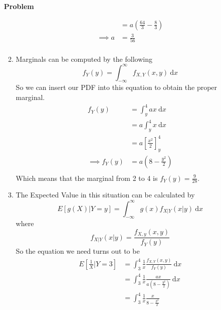 \documentclass[12pt]{article}
\newenvironment{Ex}{\textbf{Problem}\vspace{.75em}\\}{}
\newcommand{\dd}[1]{\:\mathrm{d}{#1}}
\begin{document}
\begin{enumerate}
\begin{Ex}
\begin{solution}
\begin{enumerate}
\begin{equation}
\begin{aligned}
            &= a \left(\frac{64}{3} - \frac{8}{3}\right) \\
            \implies a&=\frac{3}{56} \\
          \end{aligned}
        \end{equation}
      \item Marginals can be computed by the following
        \begin{equation}
          \label{eq:1b-marginal-def}
          f_Y(y) = \int_{-\infty}^{\infty} f_{X,Y}(x,y) \dd{x}
        \end{equation}
        So we can insert our PDF into this equation to obtain the
        proper marginal.
        \begin{equation}
          \label{eq:1b-sol}
          \begin{aligned}
            f_Y(y) &= \int_{y}^{4} ax \dd{x} \\
            &= a \int_{y}^{4} x \dd{x} \\
            &= a \left[\frac{x^2}{2}\right]_y^4 \\
            \implies f_Y(y) &= a \left(8 - \frac{y^2}{2}\right) \\
          \end{aligned}
        \end{equation}
        Which means that the marginal from 2 to 4 is $f_Y(y) =
        \frac{9}{28}$.
      \item The Expected Value in this situation can be calculated
        by
        \begin{equation}
          \label{eq:1c-expected-value}
          E[g(X)|Y=y] = \int_{-\infty}^{\infty} g(x)f_{X|Y}(x|y) \dd{x}
        \end{equation}
        where
        \begin{equation}
          \label{eq:1c-conditional-value}
          f_{X|Y}(x|y) = \frac{f_{X,y}(x,y)}{f_Y(y)}
        \end{equation}
        So the equation we need turns out to be
        \begin{equation}
          \label{eq:1c-sol}
          \begin{aligned}
            E\left[\frac{1}{X}|Y=3\right] &= \int_{3}^{4}
            \frac{1}{x} \frac{f_{X,Y}(x,y)}{f_Y(y)} \dd{x} \\
            &= \int_{3}^{4} \frac{1}{x} \frac{ax}{a\left(8 -
                \frac{y^2}{2}\right)} \dd{x} \\
            &= \int_{3}^{4} \frac{1}{x} \frac{x}{8 - \frac{3^2}{2}}

\end{aligned}
\end{equation}
\end{enumerate}
\end{solution}
\end{Ex}
\end{enumerate}
\end{document}
